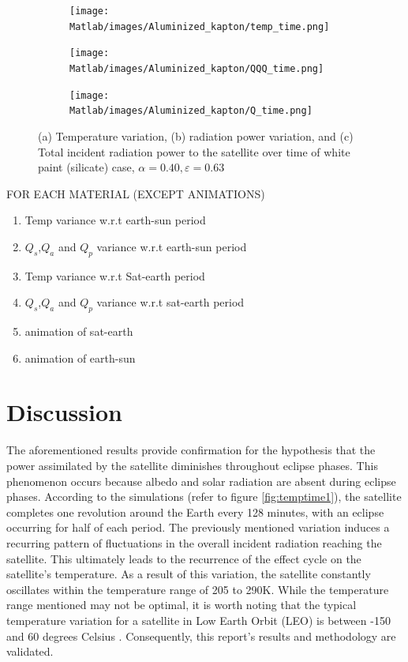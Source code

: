 \documentclass[11pt]{article}
\begin{document}
\begin{figure}[H]
    \centering
    \begin{subfigure}[b]{1\textwidth}
        \texttt{[image: Matlab/images/Aluminized\_kapton/temp\_time.png]}
        \caption{}
        \label{fig:temptime2}
    \end{subfigure}
    \begin{subfigure}[b]{1\textwidth}
        \texttt{[image: Matlab/images/Aluminized\_kapton/QQQ\_time.png]}
        \caption{}
        \label{fig:QQQtimme2}
    \end{subfigure}
    \begin{subfigure}[b]{1\textwidth}
        \texttt{[image: Matlab/images/Aluminized\_kapton/Q\_time.png]}
        \caption{}
        \label{fig:Qtime2}
    \end{subfigure}
    \caption{(a) Temperature variation, (b) radiation power variation, and (c) Total incident radiation power to the satellite over time of white paint (silicate) case, $\alpha=0.40, \varepsilon =0.63 $}
\end{figure}







 
FOR EACH MATERIAL (EXCEPT ANIMATIONS)
\begin{enumerate}
    \item Temp variance w.r.t earth-sun period
    \item $Q_{s}$,$Q_{a}$ and $Q_{p}$ variance w.r.t earth-sun period
    \item Temp variance w.r.t Sat-earth period
    \item $Q_{s}$,$Q_{a}$ and $Q_{p}$ variance w.r.t sat-earth period
    \item animation of sat-earth
    \item animation of earth-sun 


\end{enumerate}


\newpage
\section{Discussion} %
\indent The aforementioned results provide confirmation for the hypothesis that the power assimilated by the satellite diminishes throughout eclipse phases. This phenomenon occurs because albedo and solar radiation are absent during eclipse phases. According to the simulations (refer to figure \ref{fig:temptime1}), the satellite completes one revolution around the Earth every 128 minutes, with an eclipse occurring for half of each period. The previously mentioned variation induces a recurring pattern of fluctuations in the overall incident radiation reaching the satellite. This ultimately leads to the recurrence of the effect cycle on the satellite's temperature. As a result of this variation, the satellite constantly oscillates within the temperature range of 205 to 290K. While the temperature range mentioned may not be optimal, it is worth noting that the typical temperature variation for a satellite in Low Earth Orbit (LEO) is between -150 and 60 degrees Celsius \cite{iles2004photovoltaic}. Consequently, this report's results and methodology are validated.
\end{document}
